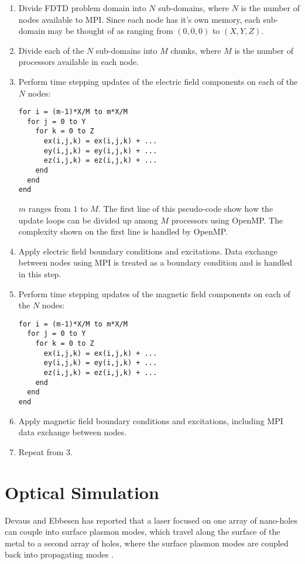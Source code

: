 \documentclass[11pt, conference, draftcls, letterpaper]{IEEEtran}
\begin{document}
\begin{enumerate}
\item Divide FDTD problem domain into $N$ sub-domains, where $N$ is
  the number of nodes available to MPI. Since each node has it's own
  memory, each sub-domain may be thought of as ranging from $(0,0,0)$
  to $(X,Y,Z)$.
\item Divide each of the $N$ sub-domains into $M$ chunks, where $M$ is
  the number of processors available in each node.
\item Perform time stepping updates of the electric field components on each of
  the $N$ nodes:
\begin{verbatim}
for i = (m-1)*X/M to m*X/M
  for j = 0 to Y
    for k = 0 to Z
      ex(i,j,k) = ex(i,j,k) + ...
      ey(i,j,k) = ey(i,j,k) + ...
      ez(i,j,k) = ez(i,j,k) + ...
    end
  end
end
\end{verbatim}
  $m$ ranges from $1$ to $M$. The first line of this pseudo-code show
  how the update loops can be divided up among $M$ processors using
  OpenMP. The complexity shown on the first line is handled by
  OpenMP. 
\item Apply electric field boundary conditions and excitations. Data
  exchange between nodes using MPI is treated as a boundary condition
  and is handled in this step.
\item Perform time stepping updates of the magnetic field components
  on each of the $N$ nodes:
\begin{verbatim}
for i = (m-1)*X/M to m*X/M
  for j = 0 to Y
    for k = 0 to Z
      ex(i,j,k) = ex(i,j,k) + ...
      ey(i,j,k) = ey(i,j,k) + ...
      ez(i,j,k) = ez(i,j,k) + ...
    end
  end
end
\end{verbatim}
\item Apply magnetic field boundary conditions and excitations,
  including MPI data exchange between nodes. 
\item Repeat from 3.
\end{enumerate}


\section{Optical Simulation}
Devaus and Ebbesen has reported that a laser focused on one array of
nano-holes can couple into surface plasmon modes, which travel along
the surface of the metal to a second array of holes, where the surface
plasmon modes are coupled back into propagating modes
\cite{devaux2003}.
\end{document}
